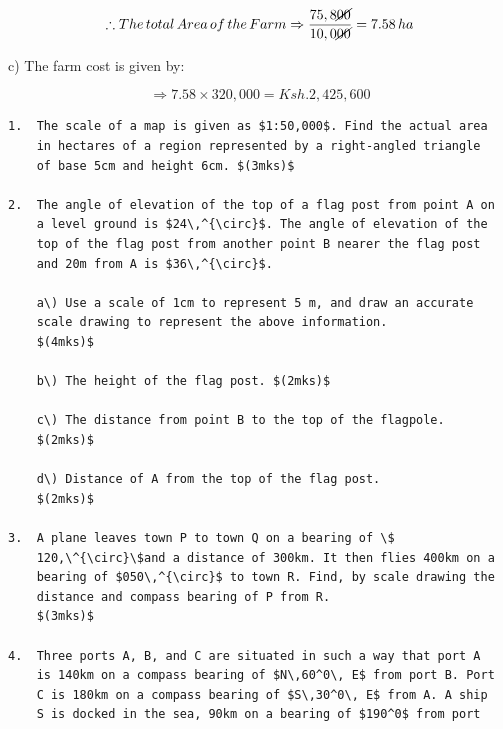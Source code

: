 \documentclass[
  a4paperpaper,
]{scrbook}
\begin{document}
\begin{tcolorbox}
\[\therefore The\,total\, Area \, of\, the \,Farm \Rightarrow \frac{75,8\cancel{00}}{10,0\cancel{00}}=7.58 \,ha
\]

c) The farm cost is given by:

\[\Rightarrow 7.58\times320,000=Ksh. 2,425,600\]

\end{tcolorbox}

\begin{tcolorbox}[enhanced jigsaw, left=2mm, colframe=quarto-callout-note-color-frame, toptitle=1mm, opacitybacktitle=0.6, rightrule=.15mm, colbacktitle=quarto-callout-note-color!10!white, colback=white, arc=.35mm, breakable, leftrule=.75mm, bottomtitle=1mm, bottomrule=.15mm, title=\textcolor{quarto-callout-note-color}{\faInfo}\hspace{0.5em}{Problems to solve}, titlerule=0mm, coltitle=black, toprule=.15mm, opacityback=0]

\begin{verbatim}
1.  The scale of a map is given as $1:50,000$. Find the actual area
    in hectares of a region represented by a right-angled triangle
    of base 5cm and height 6cm. $(3mks)$

2.  The angle of elevation of the top of a flag post from point A on
    a level ground is $24\,^{\circ}$. The angle of elevation of the
    top of the flag post from another point B nearer the flag post
    and 20m from A is $36\,^{\circ}$.

    a\) Use a scale of 1cm to represent 5 m, and draw an accurate
    scale drawing to represent the above information.
    $(4mks)$

    b\) The height of the flag post. $(2mks)$

    c\) The distance from point B to the top of the flagpole.
    $(2mks)$

    d\) Distance of A from the top of the flag post.
    $(2mks)$

3.  A plane leaves town P to town Q on a bearing of \$
    120,\^{\circ}\$and a distance of 300km. It then flies 400km on a
    bearing of $050\,^{\circ}$ to town R. Find, by scale drawing the
    distance and compass bearing of P from R.
    $(3mks)$

4.  Three ports A, B, and C are situated in such a way that port A
    is 140km on a compass bearing of $N\,60^0\, E$ from port B. Port
    C is 180km on a compass bearing of $S\,30^0\, E$ from A. A ship
    S is docked in the sea, 90km on a bearing of $190^0$ from port


\end{verbatim}
\end{tcolorbox}
\end{document}
